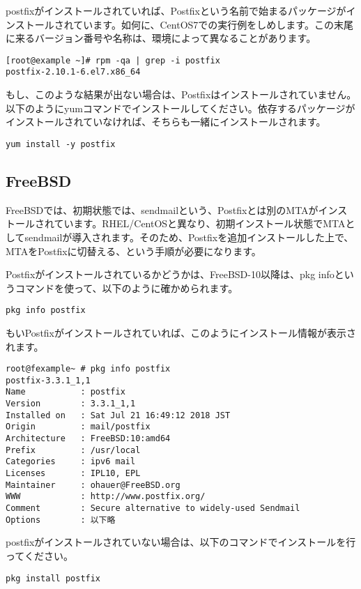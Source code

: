 postfixがインストールされていれば、Postfixという名前で始まるパッケージがインストールされています。如何に、CentOS7での実行例をしめします。この末尾に来るバージョン番号や名称は、環境によって異なることがあります。

\begin{verbatim}
[root@example ~]# rpm -qa | grep -i postfix
postfix-2.10.1-6.el7.x86_64
\end{verbatim}

もし、このような結果が出ない場合は、Postfixはインストールされていません。以下のようにyumコマンドでインストールしてください。依存するパッケージがインストールされていなければ、そちらも一緒にインストールされます。

\begin{verbatim}
yum install -y postfix
\end{verbatim}


\subsection{FreeBSD}
FreeBSDでは、初期状態では、sendmailという、Postfixとは別のMTAがインストールされています。RHEL/CentOSと異なり、初期インストール状態でMTAとしてsendmailが導入されます。そのため、Postfixを追加インストールした上で、MTAをPostfixに切替える、という手順が必要になります。

Postfixがインストールされているかどうかは、FreeBSD-10以降は、pkg infoというコマンドを使って、以下のように確かめられます。

\begin{verbatim}
pkg info postfix
\end{verbatim}

もいPostfixがインストールされていれば、このようにインストール情報が表示されます。

\begin{verbatim}
root@fexample~ # pkg info postfix
postfix-3.3.1_1,1
Name           : postfix
Version        : 3.3.1_1,1
Installed on   : Sat Jul 21 16:49:12 2018 JST
Origin         : mail/postfix
Architecture   : FreeBSD:10:amd64
Prefix         : /usr/local
Categories     : ipv6 mail
Licenses       : IPL10, EPL
Maintainer     : ohauer@FreeBSD.org
WWW            : http://www.postfix.org/
Comment        : Secure alternative to widely-used Sendmail
Options        : 以下略
\end{verbatim}


postfixがインストールされていない場合は、以下のコマンドでインストールを行ってください。


\begin{verbatim}
pkg install postfix
\end{verbatim}

